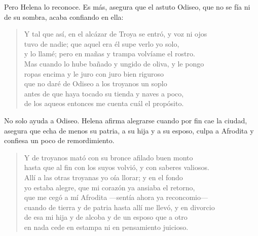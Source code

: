 \documentclass[11pt,a4paper]{article}
\begin{document}
Pero Helena lo reconoce. Es más, asegura que el astuto Odiseo, que no se fía ni de su sombra, acaba confiando en ella:

\begin{verse}
Y tal que así, en el alcázar de Troya se entró, y voz ni ojos\\
tuvo de nadie; que aquel era él supe verlo yo solo,\\
y lo llamé; pero en mañas y trampa volvíame el rostro.\\
Mas cuando lo hube bañado y ungido de oliva, y le pongo\\
ropas encima y le juro con juro bien riguroso\\
que no daré de Odiseo a los troyanos un soplo\\
antes de que haya tocado su tienda y naves a poco,\\
de los aqueos entonces me cuenta cuál el propósito.
\end{verse}

No solo ayuda a Odiseo. Helena afirma alegrarse cuando por fin cae la ciudad, asegura que echa de menos su patria, a su hija y a su esposo, culpa a Afrodita y confiesa un poco de remordimiento.

\begin{verse}
Y de troyanos mató con su bronce afilado buen monto\\
hasta que al fin con los suyos volvió, y con saberes valiosos.\\
Allí a las otras troyanas yo oía llorar; y en el fondo\\
yo estaba alegre, que mi corazón ya ansiaba el retorno,\\
que me cegó a mí Afrodita ---sentía ahora ya reconcomio---\\
cuando de tierra y de patria hasta allí me llevó, y en divorcio\\
de esa mi hija y de alcoba y de un esposo que a otro\\
en nada cede en estampa ni en pensamiento juicioso.
\end{verse}
\end{document}

